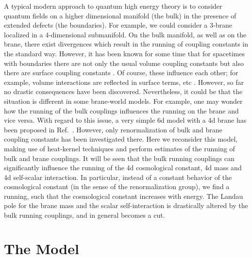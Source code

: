 \documentclass[a4paper,aps,prl,preprint,groupedaddress,showpacs,nobibnotes,tightenlines]{revtex4}
\begin{document}
A typical modern approach to quantum high energy theory is to consider
quantum fields on a
higher dimensional manifold (the bulk) in the presence 
of extended defects (the boundaries). For example, we could consider a 
3-brane localized in a 4-dimensional submanifold. On the bulk manifold, 
as  well as on the brane, there
exist divergences which result in the running of coupling constants 
in the standard way.
However, it has been known for some time that for spacetimes with boundaries 
there are not only the usual volume coupling constants but also
there are surface coupling constants \cite{surface}.
Of course, these influence each other; for example,  volume interactions
are reflected in surface terms, etc \cite{tsoupros}.
However, so far no drastic consequences have been discovered.
Nevertheless, it could be that the situation is different in some brane-world 
models. For example, one may 
wonder how the running of the bulk couplings influences the running on the 
brane and vice versa. With regard to this issue, a very simple 6d model
with a 4d brane has been proposed in Ref.~\cite{wise}. However, only
renormalization of bulk and brane coupling constants has been 
investigated there.
Here we reconsider this model, making use of  heat-kernel techniques
and perform estimates of the running of bulk and brane couplings.
It will be seen that the bulk running couplings can significantly influence 
the running of the 4d cosmological constant, 4d mass and 4d self-scalar 
interaction. In particular, instead of a constant behavior of 
the cosmological 
constant (in the sense of the renormalization group), we find a running,
such that the cosmological constant increases with energy.
The Landau pole for the brane mass and the scalar self-interaction
is drastically altered by the bulk running couplings, and in general
becomes a cut.

\section{The Model}
\end{document}
